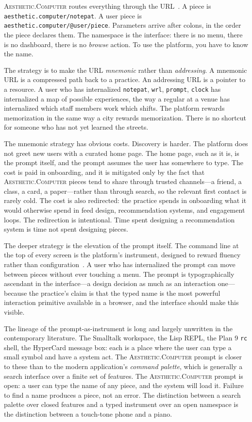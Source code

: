 \documentclass[10pt,letterpaper,twocolumn]{article}
\newcommand{\ac}{\textsc{Aesthetic.Computer}}
\begin{document}
\ac{} routes everything through the URL~\citep{scudder2026url}. A piece is \texttt{aesthetic.computer/notepat}. A user piece is \texttt{aesthetic.computer/@user/piece}. Parameters arrive after colons, in the order the piece declares them. The namespace is the interface: there is no menu, there is no dashboard, there is no \emph{browse} action. To use the platform, you have to know the name.

The strategy is to make the URL \emph{mnemonic} rather than \emph{addressing}. A mnemonic URL is a compressed path back to a practice. An addressing URL is a pointer to a resource. A user who has internalized \texttt{notepat}, \texttt{wrl}, \texttt{prompt}, \texttt{clock} has internalized a map of possible experiences, the way a regular at a venue has internalized which staff members work which shifts. The platform rewards memorization in the same way a city rewards memorization. There is no shortcut for someone who has not yet learned the streets.

The mnemonic strategy has obvious costs. Discovery is harder. The platform does not greet new users with a curated home page. The home page, such as it is, is the prompt itself, and the prompt assumes the user has somewhere to type. The cost is paid in onboarding, and it is mitigated only by the fact that \ac{} pieces tend to share through trusted channels---a friend, a class, a card, a paper---rather than through search, so the relevant first contact is rarely cold. The cost is also redirected: the practice spends in onboarding what it would otherwise spend in feed design, recommendation systems, and engagement loops. The redirection is intentional. Time spent designing a recommendation system is time not spent designing pieces.

The deeper strategy is the elevation of the prompt itself. The command line at the top of every screen is the platform's instrument, designed to reward fluency rather than configuration~\citep{scudder2026notepat}. A user who has internalized the prompt can move between pieces without ever touching a menu. The prompt is typographically ascendant in the interface---a design decision as much as an interaction one---because the practice's claim is that the typed name is the most powerful interaction primitive available in a browser, and the interface should make this visible.

The lineage of the prompt-as-instrument is long and largely unwritten in the contemporary literature. The Smalltalk workspace, the Lisp REPL, the Plan 9 \texttt{rc} shell, the HyperCard message box: each is a place where the user can type a small symbol and have a system act. The \ac{} prompt is closer to these than to the modern application's \emph{command palette}, which is generally a search interface over a finite set of features. The \ac{} prompt is open: a user can type the name of any piece, and the system will load it. Failure to find a name produces a piece, not an error. The distinction between a search palette over closed features and a typed instrument over an open namespace is the distinction between a touch-tone phone and a piano.
\end{document}
